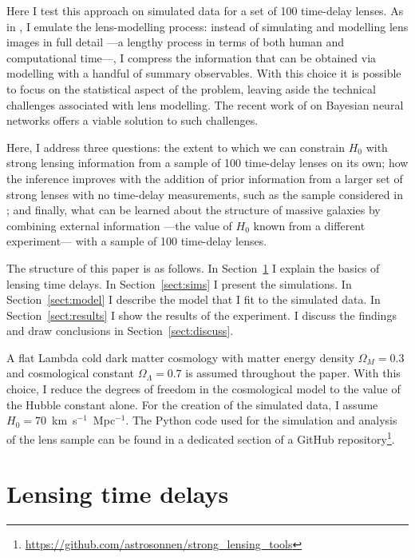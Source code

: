 \documentclass{aa}
\def\Sref#1{Section~\ref{#1}\xspace}
\begin{document}
Here I test this approach on simulated data for a set of 100 time-delay lenses. As in , I emulate the lens-modelling process: instead of simulating and modelling lens images in full detail ---a lengthy process in terms of both human and computational time---, I compress the information that can be obtained via modelling with a handful of summary observables.
With this choice it is possible to focus on the statistical aspect of the problem, leaving aside the technical challenges associated with lens modelling.
The recent work of \citet{Par++21} on Bayesian neural networks offers a viable solution to such challenges.

Here, I address three questions: the extent to which we can constrain $H_0$ with strong lensing information from a sample of 100 time-delay lenses on its own; how the inference improves with the addition of prior information from a larger set of strong lenses with no time-delay measurements, such as the sample considered in ;
and finally, what can be learned about the structure
of massive galaxies by combining external information ---the value of $H_0$
 known from a different experiment--- with a sample
of 100 time-delay lenses.

The structure of this paper is as follows. In \Sref{sect:theory} I explain the basics of lensing time delays. In \Sref{sect:sims} I present the simulations. In \Sref{sect:model} I describe the model that I fit to the simulated data. In \Sref{sect:results} I show the results of the experiment. I discuss the findings and draw conclusions in \Sref{sect:discuss}.

A flat Lambda cold dark matter cosmology with matter energy density $\Omega_M=0.3$ and cosmological constant $\Omega_\Lambda = 0.7$  is assumed throughout the paper. With this choice, I reduce the degrees of freedom in the cosmological model to the value of the Hubble constant alone.
For the creation of the simulated data, I assume $H_0=70$~km~s$^{-1}$~Mpc$^{-1}$.
The Python code used for the simulation and analysis of the lens sample can be found in a dedicated section of a GitHub repository\footnote{\url{https://github.com/astrosonnen/strong_lensing_tools}}.


\section{Lensing time delays}\label{sect:theory}
\end{document}
